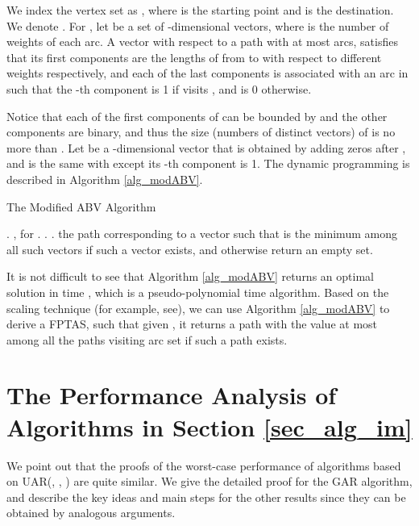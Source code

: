 \documentclass{llncs}
\numberwithin{subcase}{case}
\begin{document}
We index the vertex set  as , where  is the starting point and  is the destination. We denote . For , let  be a set of -dimensional vectors, where  is the number of weights of each arc. A vector  with respect to a  path  with at most  arcs, satisfies that its first  components are the lengths of  from  to  with respect to different weights respectively, and each of the last  components is associated with an arc in  such that the -th component is 1 if  visits , and is 0 otherwise.

Notice that each of the first  components of  can be bounded by  and the other  components are binary, and thus the size (numbers of distinct vectors) of  is no more than . Let  be a -dimensional vector that is obtained by adding  zeros after , and  is the same with  except its -th component is 1. The dynamic programming is described in Algorithm \ref{alg_modABV}.

\begin{algorithm}[htb]
\caption{The Modified ABV Algorithm}
\label{alg_modABV}
\begin{algorithmic}[1]
\STATE .
\STATE ,  for .
\FOR {}
    \FOR {}
            \IF {, }
                \IF {}
                 \STATE .
                 \ELSE
                 \STATE .
                \ENDIF
            \ENDIF
            \ENDFOR
        \ENDFOR
    \ENDFOR
\ENDFOR
\RETURN the path  corresponding to a vector  such that  is the minimum among all such vectors if such a vector exists, and otherwise return an empty set.
\end{algorithmic}
\end{algorithm}

It is not difficult to see that Algorithm \ref{alg_modABV} returns an optimal solution in time , which is a pseudo-polynomial time algorithm. Based on the scaling technique (for example, see\cite{ABV06}), we can use Algorithm \ref{alg_modABV} to derive a FPTAS, such that given , it returns a path with the value at most  among all the paths  visiting arc set  if such a path exists.

\section{The Performance Analysis of Algorithms in Section \ref{sec_alg_im}}\label{app_proof}
We point out that the proofs of the worst-case performance of algorithms based on UAR(, , ) are quite similar. We give the detailed proof for the GAR algorithm, and describe the key ideas and main steps for the other results since they can be obtained by analogous arguments.
\end{document}
